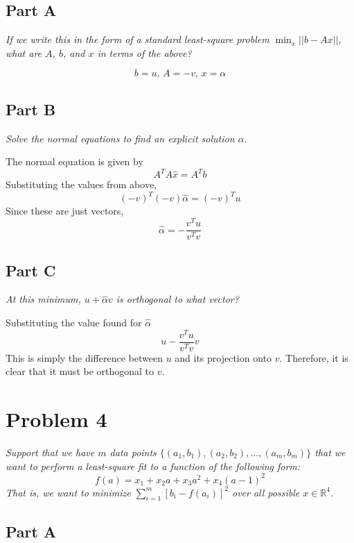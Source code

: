 \documentclass{article}
\begin{document}
\subsection*{Part A}

\textit{If we write this in the form of a standard least-square problem $
\min_x || b - Ax ||$, what are $A$, $b$, and $x$ in terms of the above?}

\bigbreak

$$ b = u,\, A = -v,\, x = \alpha $$

\subsection*{Part B}

\textit{Solve the normal equations to find an explicit solution
$\hat{\alpha}$.}

\bigbreak

The normal equation is given by
$$ A^T A \hat{x} = A^T b $$
Substituting the values from above,
$$ (-v)^T (-v) \hat{\alpha} = (-v)^T u $$
Since these are just vectors,
$$ \hat{\alpha} = -\frac{v^T u}{v^T v} $$

\subsection*{Part C}

\textit{At this minimum, $u + \hat{\alpha} v$ is orthogonal to what vector?}

\bigbreak

Substituting the value found for $\hat{\alpha}$
$$ u - \frac{v^T u}{v^T v} v $$
This is simply the difference between $u$ and its projection onto $v$.
Therefore, it is clear that it must be orthogonal to $v$.

\section*{Problem 4}

\textit{Support that we have $m$ data points $\{(a_1, b_1), (a_2, b_2),
\ldots, (a_m, b_m)\}$ that we want to perform a least-square fit to a
function of the following form:}
$$ f(a) = x_1 + x_2 a + x_3 a^2 + x_4 (a - 1)^2 $$
\textit{That is, we want to minimize $\sum_{i = 1}^m [b_i - f(a_i)]^2$ over
all possible $x \in \mathbb{R}^4$.}

\subsection*{Part A}
\end{document}
